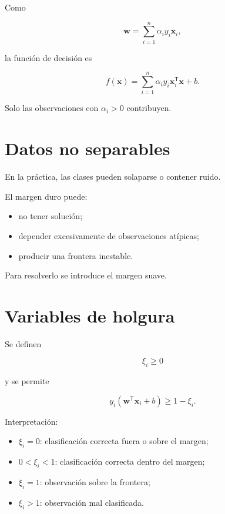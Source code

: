 \documentclass[
  spanish,
  10.5pt,
  letterpaper,
  DIV=11,
  numbers=noendperiod,
  oneside,
  open=any]{scrreprt}
\providecommand{\tightlist}{%
  \setlength{\itemsep}{0pt}\setlength{\parskip}{0pt}}
\theoremstyle{definition}
\theoremstyle{definition}
\theoremstyle{plain}
\theoremstyle{remark}
\begin{document}
Como

\[
\mathbf{w}
=
\sum_{i=1}^{n}
\alpha_i y_i\mathbf{x}_i,
\]

la función de decisión es

\[
f(\mathbf{x})
=
\sum_{i=1}^{n}
\alpha_i y_i
\mathbf{x}_i^{\mathsf T}\mathbf{x}
+b.
\]

Solo las observaciones con \(\alpha_i>0\) contribuyen.

\section*{Datos no separables}\label{datos-no-separables}


En la práctica, las clases pueden solaparse o contener ruido.

El margen duro puede:

\begin{itemize}
\tightlist
\item
  no tener solución;
\item
  depender excesivamente de observaciones atípicas;
\item
  producir una frontera inestable.
\end{itemize}

Para resolverlo se introduce el margen suave.

\section*{Variables de holgura}\label{variables-de-holgura}


Se definen

\[
\xi_i\geq 0
\]

y se permite

\[
y_i
\left(
\mathbf{w}^{\mathsf T}\mathbf{x}_i+b
\right)
\geq
1-\xi_i.
\]

Interpretación:

\begin{itemize}
\tightlist
\item
  \(\xi_i=0\): clasificación correcta fuera o sobre el margen;
\item
  \(0<\xi_i<1\): clasificación correcta dentro del margen;
\item
  \(\xi_i=1\): observación sobre la frontera;
\item
  \(\xi_i>1\): observación mal clasificada.
\end{itemize}
\end{document}
